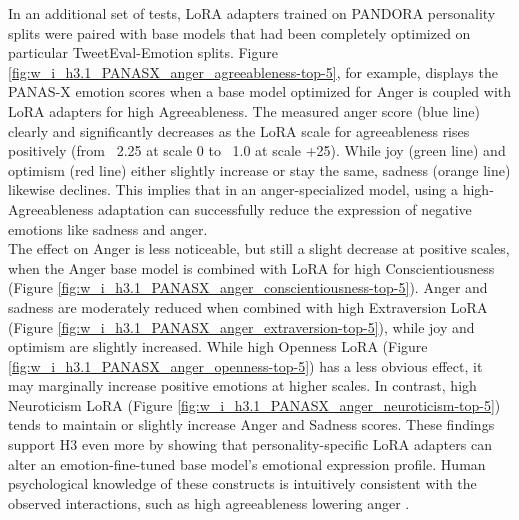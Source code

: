 \documentclass{DESSThesis}
\begin{document}
In an additional set of tests, LoRA adapters trained on PANDORA personality splits were paired with base models that had been completely optimized on particular TweetEval-Emotion splits. Figure \ref{fig:w_i_h3.1_PANASX_anger_agreeableness-top-5}, for example, displays the PANAS-X emotion scores when a base model optimized for Anger is coupled with LoRA adapters for high Agreeableness. The measured anger score (blue line) clearly and significantly decreases as the LoRA scale for agreeableness rises positively (from ~2.25 at scale 0 to ~1.0 at scale +25). While joy (green line) and optimism (red line) either slightly increase or stay the same, sadness (orange line) likewise declines. This implies that in an anger-specialized model, using a high-Agreeableness adaptation can successfully reduce the expression of negative emotions like sadness and anger.
\\
The effect on Anger is less noticeable, but still a slight decrease at positive scales, when the Anger base model is combined with LoRA for high Conscientiousness (Figure \ref{fig:w_i_h3.1_PANASX_anger_conscientiousness-top-5}). Anger and sadness are moderately reduced when combined with high Extraversion LoRA (Figure \ref{fig:w_i_h3.1_PANASX_anger_extraversion-top-5}), while joy and optimism are slightly increased. While high Openness LoRA (Figure \ref{fig:w_i_h3.1_PANASX_anger_openness-top-5}) has a less obvious effect, it may marginally increase positive emotions at higher scales. In contrast, high Neuroticism LoRA (Figure \ref{fig:w_i_h3.1_PANASX_anger_neuroticism-top-5}) tends to maintain or slightly increase Anger and Sadness scores. These findings support H3 even more by showing that personality-specific LoRA adapters can alter an emotion-fine-tuned base model's emotional expression profile. Human psychological knowledge of these constructs is intuitively consistent with the observed interactions, such as high agreeableness lowering anger \cite{feng_five-factor_2024, david_watson_panas-x_1994}.
\\
\end{document}
